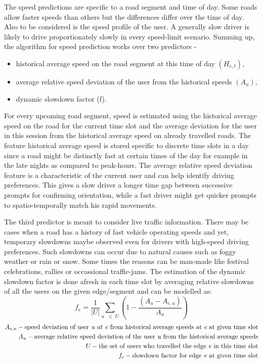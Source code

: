 \documentclass{iitkthesis}
\begin{document}
The speed predictions are specific to a road segment and time of day. 
Some roads allow faster speeds than others but the differences 
differ over the time of day.
Also to be considered is the speed profile of the user. A generally 
slow driver is likely to drive proportionately slowly in every speed-limit scenario. 
Summing up, the algorithm for speed prediction works over two predictors - 
\begin{itemize}
\item historical average speed on the road segment at this time of day 
$(H_{e,t})$,
\item average relative speed deviation of the user from the historical 
speeds $({A_u})$,
\item dynamic slowdown factor (f).
\end{itemize}

For every upcoming road segment, speed is estimated using the historical 
average speed on the road for the current time slot and the average 
deviation for the user in this session from the historical average speed 
on already travelled roads. 
The feature historical average speed is stored specific to discrete time 
slots in a day since a road might be distinctly fast at certain times of
the day for example in the late nights as compared to 
peak-hours. The average relative speed deviation feature is a
characteristic of the current user and can help identify driving preferences. 
This gives a slow driver a longer time gap between successive prompts for 
confirming orientation, while a fast driver might get quicker prompts 
to spatio-temporally match his rapid movements.  

The third predictor is meant to consider live traffic information. There 
may be cases when a road has a history of fast vehicle operating speeds and 
yet, temporary slowdowns maybe observed even for drivers with high-speed 
driving preferences. Such slowdowns can occur due to natural causes   
such as foggy weather or rain or snow. Some times the reasons can be man-made 
like festival celebrations, rallies or occassional traffic-jams. The 
estimation of the dynamic slowdown factor is 
done afresh in each time slot by averaging relative slowdowns
of all the users on the given edge/segment and can be modelled as:
\[\displaystyle f_{e} = \frac{1}{|U|}\sum_{u \text{ } \in \textit{ U}}(1-\frac{(A_u - A_{e,u})}{A_u})\]  
\begin{align*}
A_{e,u} - \text{speed deviation of user} \textit{ u } at \textit{ e } \text{from historical average speeds at }\textit{e} \text{ at given time slot} \\
A_u - \text{average relative speed deviation of the user \textit{u} from the historical average speeds} \\
U - \text{the set of users who travelled the edge \textit{e} in this time slot} \\
f_e - \text{slowdown factor for edge \textit{e} at given time slot}
\end{align*}
\end{document}
